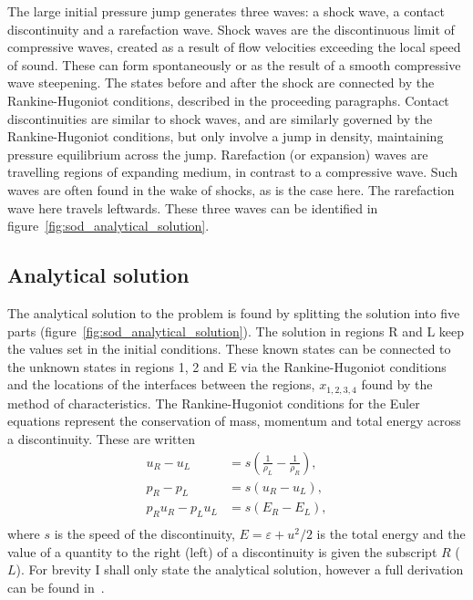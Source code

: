 The large initial pressure jump generates three waves: a shock wave, a contact discontinuity and a rarefaction wave. Shock waves are the discontinuous limit of compressive waves, created as a result of flow velocities exceeding the local speed of sound. These can form spontaneously or as the result of a smooth compressive wave steepening. The states before and after the shock are connected by the Rankine-Hugoniot conditions, described in the proceeding paragraphs. Contact discontinuities are similar to shock waves, and are similarly governed by the Rankine-Hugoniot conditions, but only involve a jump in density, maintaining pressure equilibrium across the jump. Rarefaction (or expansion) waves are travelling regions of expanding medium, in contrast to a compressive wave. Such waves are often found in the wake of shocks, as is the case here. The rarefaction wave here travels leftwards. These three waves can be identified in figure~\ref{fig:sod_analytical_solution}.

\subsection{Analytical solution}

The analytical solution to the problem is found by splitting the solution into five parts (figure~\ref{fig:sod_analytical_solution}). The solution in regions R and L keep the values set in the initial conditions. These known states can be connected to the unknown states in regions 1, 2 and E via the Rankine-Hugoniot conditions and the locations of the interfaces between the regions, $x_{1, 2, 3, 4}$ found by the method of characteristics. The Rankine-Hugoniot conditions for the Euler equations represent the conservation of mass, momentum and total energy across a discontinuity. These are written
\begin{equation}
  \label{eq:rk}
\begin{aligned}
  u_R - u_L &= s\left(\frac{1}{\rho_L} - \frac{1}{\rho_R}\right),\\
  p_R - p_L &= s(u_R - u_L),\\
  p_R u_R - p_L u_L &= s (E_R - E_L),\\
\end{aligned}
\end{equation}
where $s$ is the speed of the discontinuity, $E = \varepsilon + u^2/2$ is the total energy and the value of a quantity to the right (left) of a discontinuity is given the subscript $R$ ($L$). For brevity I shall only state the analytical solution, however a full derivation can be found in~\cite{danailaIntroductionScientificComputing2006}.

